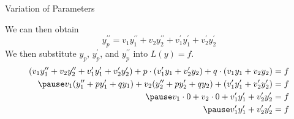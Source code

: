 \documentclass{beamer}
\begin{document}
\begin{frame}{Variation of Parameters}
\begin{block}{}
We can then obtain
\begin{equation*}
y_p^{\prime\prime}=v_1 y_1^{\prime\prime} + v_2 y_2^{\prime\prime} + v_1^\prime y_1^\prime + v_2^\prime y_2^\prime
\end{equation*}\pause
We then substitute $y_p$, $y_p^\prime$, and $y_p^{\prime\prime}$ into $L(y)=f$.
\begin{equation*}
\begin{aligned}
(v_1 y_1^{\prime\prime} + v_2 y_2^{\prime\prime} + v_1^\prime y_1^\prime + v_2^\prime y_2^\prime) + p\cdot (v_1^\prime y_1 + v_2^\prime y_2) + q\cdot (v_1 y_1 + v_2 y_2)&=f\\\pause
v_1(y_1^{\prime\prime}+p y_1^\prime+q y_1) + 
v_2(y_2^{\prime\prime}+p y_2^\prime+q y_2) +
(v_1^\prime y_1^\prime + v_2^\prime y_2^\prime) &=f\\\pause
v_1\cdot 0 + v_2\cdot 0 + v_1^\prime y_1^\prime + v_2^\prime y_2^\prime &=f\\\pause
v_1^\prime y_1^\prime + v_2^\prime y_2^\prime &=f
\end{aligned}
\end{equation*}
\end{block}
\end{frame}
\end{document}
